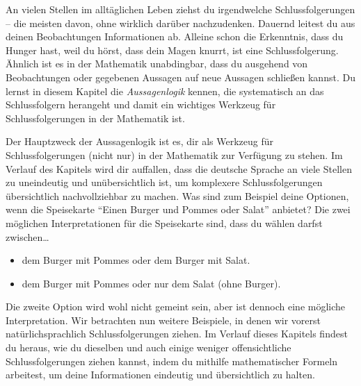 \documentclass[../../main.tex]{subfiles}
\begin{document}


    An vielen Stellen im alltäglichen Leben ziehst du irgendwelche Schlussfolgerungen -- die meisten davon, ohne wirklich darüber nachzudenken. Dauernd leitest du aus deinen Beobachtungen Informationen ab. Alleine schon die Erkenntnis, dass du Hunger hast, weil du hörst, dass dein Magen knurrt, ist eine Schlussfolgerung. Ähnlich ist es in der Mathematik unabdingbar, dass du ausgehend von Beobachtungen oder gegebenen Aussagen auf neue Aussagen schließen kannst. Du lernst in diesem Kapitel die \emph{Aussagenlogik} kennen, die systematisch an das Schlussfolgern herangeht und damit ein wichtiges Werkzeug für Schlussfolgerungen in der Mathematik ist.
    
    Der Hauptzweck der Aussagenlogik ist es, dir als Werkzeug für Schlussfolgerungen (nicht nur) in der Mathematik zur Verfügung zu stehen. Im Verlauf des Kapitels wird dir auffallen, dass die deutsche Sprache an viele Stellen zu uneindeutig und unübersichtlich ist, um komplexere Schlussfolgerungen übersichtlich nachvollziehbar zu machen. Was sind zum Beispiel deine Optionen, wenn die Speisekarte \enquote{Einen Burger und Pommes oder Salat} anbietet? Die zwei möglichen Interpretationen für die Speisekarte sind, dass du wählen darfst zwischen\dots
    \begin{itemize}[label=\dots, nosep]
        \item dem Burger mit Pommes oder dem Burger mit Salat.
        \item dem Burger mit Pommes oder nur dem Salat (ohne Burger).
    \end{itemize}
    Die zweite Option wird wohl nicht gemeint sein, aber ist dennoch eine mögliche Interpretation. Wir betrachten nun weitere Beispiele, in denen wir vorerst natürlichsprachlich Schlussfolgerungen ziehen. Im Verlauf dieses Kapitels findest du heraus, wie du dieselben und auch einige weniger offensichtliche Schlussfolgerungen ziehen kannst, indem du mithilfe mathematischer Formeln arbeitest, um deine Informationen eindeutig und übersichtlich zu halten.
    
    
\end{document}
